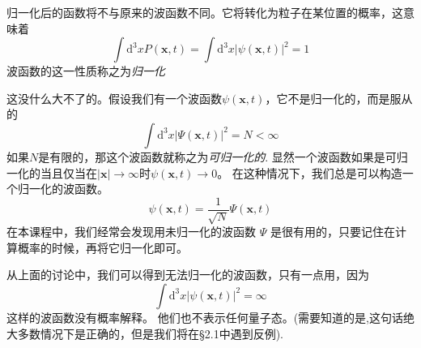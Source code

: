 归一化后的函数将不与原来的波函数不同。它将转化为粒子在某位置的概率，这意味着
\[
\int \mathrm{d}^{3}xP(\mathbf{x},t)=\int\mathrm{d}^{3}x|\psi(\mathbf{x},t)|^{2}=1 
\]
波函数的这一性质称之为\textit{归一化}\par
这没什么大不了的。假设我们有一个波函数$\psi(\mathbf{x},t)$，它不是归一化的，而是服从的
\[
\int \mathrm{d}^{3}x|\Psi({\mathbf{x}},t)|^{2}=N<\infty 
\]
如果$N$是有限的，那这个波函数就称之为\textit{可归一化的}. 显然一个波函数如果是可归一化的当且仅当在$|\mathbf{x}|\to\infty$时$\psi({\mathbf{x}},t) \to 0$。 在这种情况下，我们总是可以构造一个归一化的波函数。
\[
\psi(\mathbf{x},t)={\frac{1}{\sqrt{N}}}\Psi(\mathbf{x},t) 
\]
在本课程中，我们经常会发现用未归一化的波函数 $\Psi$ 是很有用的，只要记住在计算概率的时候，再将它归一化即可。\par
从上面的讨论中，我们可以得到无法归一化的波函数，只有一点用，因为
\[
\int \mathrm{d}^{3}x|\psi({\mathbf{x}},t)|^{2}=\infty 
\]
这样的波函数没有概率解释。 他们也不表示任何量子态。(需要知道的是,这句话绝大多数情况下是正确的，但是我们将在\S 2.1中遇到反例).\par

